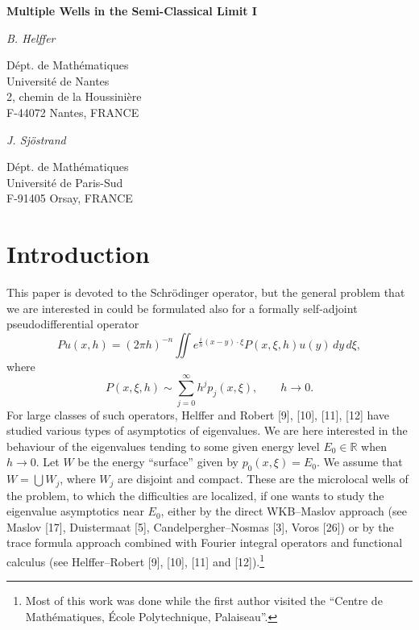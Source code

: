 \documentclass[11pt,a4paper]{article}
\newcommand{\R}{\mathbb R}
\numberwithin{equation}{section}
\theoremstyle{remark}
\begin{document}
\begin{center}
{\LARGE\bfseries Multiple Wells in the Semi-Classical Limit I}\par
\vspace{1.2cm}
\begin{minipage}[t]{0.42\textwidth}\centering
{\large\itshape B. Helffer}\par\vspace{0.45cm}
D\'ept. de Math\'ematiques\\
Universit\'e de Nantes\\
2, chemin de la Houssini\`ere\\
F-44072 Nantes, FRANCE
\end{minipage}
\hfill
\begin{minipage}[t]{0.42\textwidth}\centering
{\large\itshape J. Sj\"ostrand}\par\vspace{0.45cm}
D\'ept. de Math\'ematiques\\
Universit\'e de Paris-Sud\\
F-91405 Orsay, FRANCE
\end{minipage}
\end{center}
\vspace{1.2cm}

\setcounter{section}{-1}
\section{Introduction}
This paper is devoted to the Schr\"odinger operator, but the general problem that we are interested in could be formulated also for a formally self-adjoint pseudodifferential operator
\begin{equation}
Pu(x,h)=(2\pi h)^{-n}\iint e^{\frac{i}{h}(x-y)\cdot\xi}P(x,\xi,h)u(y)\,dy\,d\xi,
\end{equation}
where
\begin{equation}
P(x,\xi,h)\sim\sum_{j=0}^{\infty}h^j p_j(x,\xi),\qquad h\to0.
\end{equation}
For large classes of such operators, Helffer and Robert [9], [10], [11], [12] have studied various types of asymptotics of eigenvalues. We are here interested in the behaviour of the eigenvalues tending to some given energy level $E_0\in\R$ when $h\to0$. Let $W$ be the energy ``surface'' given by $p_0(x,\xi)=E_0$. We assume that $W=\bigcup W_j$, where $W_j$ are disjoint and compact. These are the microlocal wells of the problem, to which the difficulties are localized, if one wants to study the eigenvalue asymptotics near $E_0$, either by the direct WKB--Maslov approach (see Maslov [17], Duistermaat [5], Candelpergher--Nosmas [3], Voros [26]) or by the trace formula approach combined with Fourier integral operators and functional calculus (see Helffer--Robert [9], [10], [11] and [12]).\footnote{Most of this work was done while the first author visited the ``Centre de Math\'ematiques, \'Ecole Polytechnique, Palaiseau''.}
\end{document}
